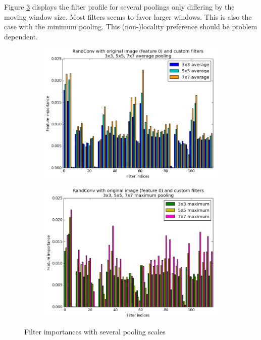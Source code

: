 \documentclass[a4paper]{report}
\newlength{\larg}
\begin{document}
	\par
	Figure \ref{fig:FIPoolScale} displays the filter profile for several poolings only differing by the moving window size. Most filters seems to favor larger windows. This is also the case with the minimum pooling. This (non-)locality preference should be problem dependent.
	
	
	\begin{figure}
		\begin{subfigure}{.5\textwidth}
			\centering
			\includegraphics[width=1.\linewidth]{images/FIPoolAvg357.png}
			\caption{\label{fig:FIPoolAvg357}}
		\end{subfigure}%
		\begin{subfigure}{.5\textwidth}
			\centering
			\includegraphics[width=1.\linewidth]{images/FIPoolMax357.png}
			\caption{\label{fig:FIPoolMax357}}
		\end{subfigure}
		\caption{\label{fig:FIPoolScale}Filter importances with several pooling scales}
	\end{figure}
		
\end{document}
